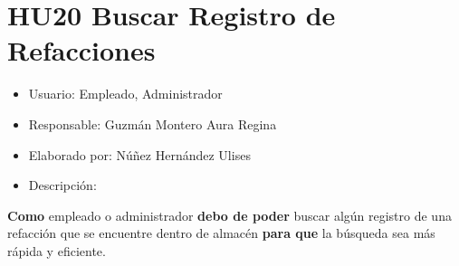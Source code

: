 \section{HU20 Buscar Registro de Refacciones}
\begin{itemize}
	\item Usuario: Empleado, Administrador
	\item Responsable: Guzmán Montero Aura Regina
	\item Elaborado por: Núñez Hernández Ulises
	\item Descripción:\\
\end{itemize}

\textbf{Como} empleado o administrador \textbf{debo de poder} buscar algún registro de una refacción que se encuentre dentro de almacén \textbf{para que} la búsqueda sea más rápida y eficiente.